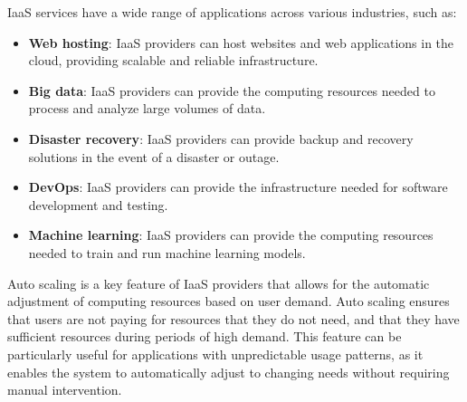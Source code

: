 \documentclass[../main.tex]{subfiles}
\begin{document}
IaaS services have a wide range of applications across various industries, such as:
\begin{itemize}
    \item \textbf{Web hosting}: IaaS providers can host websites and web applications in the cloud, providing scalable and reliable infrastructure.
    \item \textbf{Big data}: IaaS providers can provide the computing resources needed to process and analyze large volumes of data.
    \item \textbf{Disaster recovery}: IaaS providers can provide backup and recovery solutions in the event of a disaster or outage.
    \item \textbf{DevOps}: IaaS providers can provide the infrastructure needed for software development and testing.
    \item \textbf{Machine learning}: IaaS providers can provide the computing resources needed to train and run machine learning models.
\end{itemize}

Auto scaling is a key feature of IaaS providers that allows for the automatic adjustment of computing resources based on user demand. Auto scaling ensures that users are not paying for resources that they do not need, and that they have sufficient resources during periods of high demand. This feature can be particularly useful for applications with unpredictable usage patterns, as it enables the system to automatically adjust to changing needs without requiring manual intervention.
\end{document}
